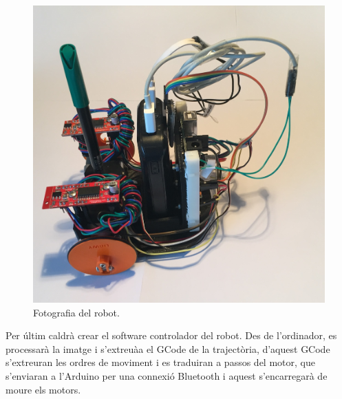\begin{figure}[H]
	\centering
	\includegraphics[scale=0.1]{RobotFoto}
	\caption{Fotografia del robot.}
	\label{fig:foto}
\end{figure}

Per últim caldrà crear el software controlador del robot. Des de l'ordinador, es processarà la imatge i s'extreuàa el GCode de la trajectòria, d'aquest GCode s'extreuran les ordres de moviment i es traduiran a passos del motor, que s'enviaran a l'Arduino per una connexió Bluetooth i aquest s'encarregarà de moure els motors. 

